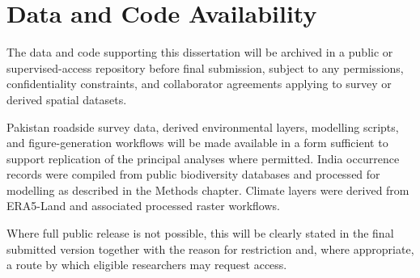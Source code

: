 \cleardoublepage
\chapter*{Data and Code Availability}

The data and code supporting this dissertation will be archived in a public or supervised-access repository before final submission, subject to any permissions, confidentiality constraints, and collaborator agreements applying to survey or derived spatial datasets.

Pakistan roadside survey data, derived environmental layers, modelling scripts, and figure-generation workflows will be made available in a form sufficient to support replication of the principal analyses where permitted. India occurrence records were compiled from public biodiversity databases and processed for modelling as described in the Methods chapter. Climate layers were derived from ERA5-Land and associated processed raster workflows.

Where full public release is not possible, this will be clearly stated in the final submitted version together with the reason for restriction and, where appropriate, a route by which eligible researchers may request access.